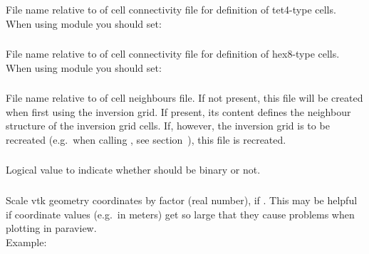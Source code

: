 \subsubsection{}
File name relative to  of cell connectivity file for 
definition of tet4-type cells.\\
When using module  you should set:\\
\subsubsection{}
File name relative to  of cell connectivity file for 
definition of hex8-type cells.\\
When using module  you should set:\\
\subsubsection{}
File name relative to  of cell neighbours file. If not
present, this file will be created when first using the inversion grid. If present, its content defines 
the neighbour structure of the inversion grid cells. If, however, the inversion grid
is to be recreated (e.g.\ when calling , see section~),
this file is recreated.
\subsubsection{}
Logical value to indicate whether  should be binary or not.
\subsubsection{}
Scale vtk geometry coordinates by factor  (real number), if 
. This may be helpful if coordinate values (e.g.\ in meters) 
get so large that they cause problems when plotting in paraview.\\
Example:\\
\\
%
